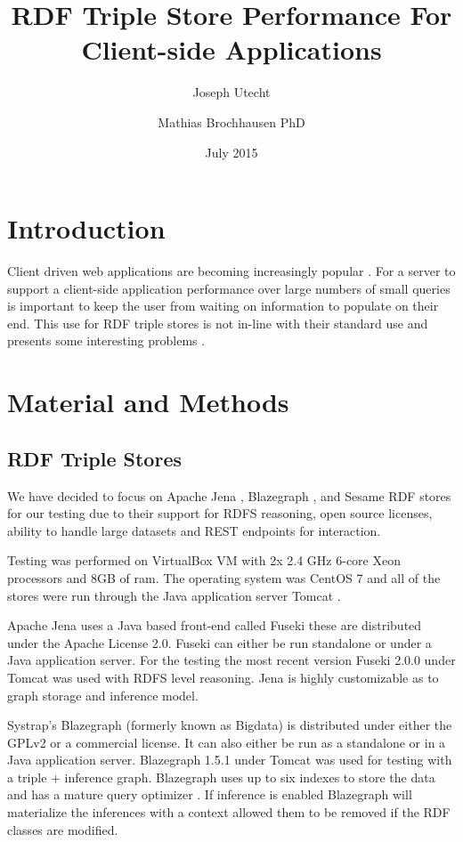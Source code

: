 \documentclass{llncs}
\title{RDF Triple Store Performance For Client-side Applications}
\author{Joseph Utecht \and Mathias Brochhausen PhD}
\institute{Department of Biomedical Informatics, University of Arkansas for Medical Sciences, Little Rock, AR}
\date{July 2015}
\begin{document}
\maketitle
\section{Introduction}

Client driven web applications are becoming increasingly popular \cite{Fielding2000}.  For a server to support a client-side application performance over large numbers of small queries is important to keep the user from waiting on information to populate on their end.  This use for RDF triple stores is not in-line with their standard use and presents some interesting problems \cite{Battle2008}.

\section{Material and Methods}
\subsection{RDF Triple Stores}

We have decided to focus on Apache Jena \cite{Jena}, Blazegraph \cite{Blazegraph}, and Sesame \cite{Sesame} RDF stores for our testing due to their support for RDFS reasoning, open source licenses, ability to handle large datasets and REST endpoints for interaction. \cite{Voigt2012}

Testing was performed on VirtualBox VM \cite{Virtualbox} with 2x 2.4 GHz 6-core Xeon processors and 8GB of ram.  The operating system was CentOS 7 \cite{Centos} and all of the stores were run through the Java application server Tomcat \cite{Tomcat}.

Apache Jena uses a Java based front-end called Fuseki these are distributed under the Apache License 2.0.  Fuseki can either be run standalone or under a Java application server.  For the testing the most recent version Fuseki 2.0.0 under Tomcat was used with RDFS level reasoning.  Jena is highly customizable as to graph storage and inference model.

Systrap's Blazegraph (formerly known as Bigdata) is distributed under either the GPLv2 or a commercial license.  It can also either be run as a standalone or in a Java application server.  Blazegraph 1.5.1 under Tomcat was used for testing with a triple + inference graph.  Blazegraph uses up to six indexes to store the data and has a mature query optimizer \cite{RDFDatabaseSystems}.  If inference is enabled Blazegraph will materialize the inferences with a context allowed them to be removed if the RDF classes are modified.
\end{document}
